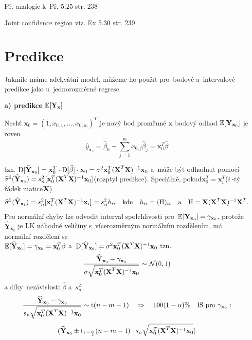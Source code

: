 Př. analogie k~Př. 5.25 str. 238

\begin{remark}
	Joint confidence region viz. Ex 5.30 str. 239
\end{remark}



\section{Predikce}
Jakmile máme adekvátní model, můžeme ho použít pro~bodové a~intervalové predikce jako u~jednorozměrné regrese

\textbf{ a) predikce} $\mathbb{E} [\textbf{Y}_{\textbf{x}}]$

Nechť $\textbf{x}_0 = (1, x_{0,1},..., x_{0,m})^T$ je nový bod proměnné $\textbf{x}$ bodový odhad $\mathbb{E} [\textbf{Y}_{\textbf{x}_0}]$ je roven
 $$
 \widehat{y}_{\textbf{x}_0} = \widehat{\beta}_0 + \sum_{j = 1}^m x_{0,j} \widehat{\beta}_j = \textbf{x}_0^T \widehat{\beta}
 $$

tzn. $\mathrm{D} [\widehat{\textbf{Y}}_{\textbf{x}_0}] = \textbf{x}_0^T \cdot \mathrm{D} [\widehat{\beta}] \cdot \textbf{x}_0 = \sigma^2 \textbf{x}_0^T(\textbf{X}^T \textbf{X})^{-1} \textbf{x}_0$ a~může být odhadnut pomocí \\
 $
 \widehat{\sigma}^2(\widehat{\textbf{Y}}_{\textbf{x}_0}) = s_n^2 [\textbf{x}_0^T(\textbf{X}^T \textbf{X})^{-1} \textbf{x}_0] $(rozptyl predikce). Speciálně, pokud$ \textbf{x}_0^T = \textbf{x}_i^T $($ i~$-tý řádek matice$ \textbf{X} $)
 $$
  \widehat{\sigma}^2(\widehat{\textbf{Y}}_{\textbf{x}_i}) = s_n^2 [\textbf{x}_i^T(\textbf{X}^T \textbf{X})^{-1} \textbf{x}_i] = s_n^2 h_{ii} \quad \text{kde} \quad h_{ii} = (\text{H})_{ii} \quad \text{a} \quad \text{H} = \textbf{X} (\textbf{X}^T  \textbf{X})^{-1} \textbf{X}^T.
 $$
Pro normální chyby lze odvodit interval spolehlivosti pro~$\mathbb{E} [\textbf{Y}_{\textbf{x}_0}] = \gamma_{\textbf{x}_0}$, protože $\widehat{\textbf{Y}}_{\textbf{x}_0}$ je LK náhodné veličiny s~vícerozměrným normálním rozdělením, má normální rozdělení se~\\ $\mathbb{E} [\widehat{\textbf{Y}}_{\textbf{x}_0}] = \gamma_{\textbf{x}_0} = \textbf{x}_0^T \beta$ a~$\mathrm{D} [\widehat{\textbf{Y}}_{\textbf{x}_0}] = \sigma^2 \textbf{x}_0^T(\textbf{X}^T \textbf{X})^{-1} \textbf{x}_0$
tzn.
 $$
\frac{\widehat{\textbf{Y}}_{\textbf{x}_0} - \gamma_{\textbf{x}_0}}{\sigma \sqrt{\textbf{x}_0^T(\textbf{X}^T \textbf{X})^{-1} \textbf{x}_0}} \sim \mathcal{N}(0,1)
 $$
a díky~nezávislosti $\widehat{\beta}$ a~$s_n^2$
 $$
 \frac{\widehat{\textbf{Y}}_{\textbf{x}_0} - \gamma_{\textbf{x}_0}}{s_n \sqrt{\textbf{x}_0^T(\textbf{X}^T \textbf{X})^{-1} \textbf{x}_0}} \sim \mathrm{t}(n-m-1) \quad \Rightarrow \quad 100(1 - \alpha) \% \quad \text{IS pro~} \gamma_{\textbf{x}_0}:
 $$
 $$
   (\widehat{\textbf{Y}}_{\textbf{x}_0} \pm \mathrm{t}_{1-\frac{\alpha}{2}}(n-m-1) \cdot s_n \sqrt{\textbf{x}_0^T(\textbf{X}^T \textbf{X})^{-1} \textbf{x}_0})
 $$

